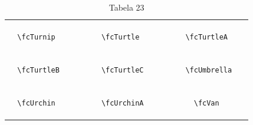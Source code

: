 \documentclass[x11names]{article}
\begin{document}
\begin{table}[H]
\begin{tabular}{|c|c|c|c|c|c|}
		&\multirow{5}{*}{	\fcTurnip	[scale=0.16]} & &\multirow{5}{*}{	\fcTurtle	[scale=0.64]} & &\multirow{5}{*}{	\fcTurtleA	[scale=0.64]}\\	& & & & & \\	& & & & & \\	\verb|	\fcTurnip	| & & \verb|	\fcTurtle	| & & \verb|	\fcTurtleA	| & \\	& & & & & \\	& & & & & \\	& & & & & \\	\hline									
		&\multirow{5}{*}{	\fcTurtleB	[scale=0.16]} & &\multirow{5}{*}{	\fcTurtleC	[scale=0.16]} & &\multirow{5}{*}{	\fcUmbrella	[scale=0.64]}\\	& & & & & \\	& & & & & \\	\verb|	\fcTurtleB	| & & \verb|	\fcTurtleC	| & & \verb|	\fcUmbrella	| & \\	& & & & & \\	& & & & & \\	& & & & & \\	\hline									
		&\multirow{5}{*}{	\fcUrchin	[scale=0.16]} & &\multirow{5}{*}{	\fcUrchinA	[scale=0.16]} & &\multirow{5}{*}{	\fcVan	[scale=0.64]}\\	& & & & & \\	& & & & & \\	\verb|	\fcUrchin	| & & \verb|	\fcUrchinA	| & & \verb|	\fcVan	| & \\	& & & & & \\	& & & & & \\	& & & & & \\		\hline 	\hline 	\end{tabular}	\caption{	Tabela 23	}\label{	Tab23	}\end{table}
\end{document}
